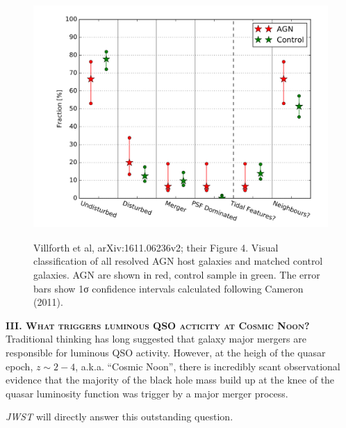\documentclass[11pt,epsf]{article}
\begin{document}
\begin{figure}[h]
  \begin{center}
   \hspace{-0.5cm}
    \includegraphics[height=8.5cm,width=12.2cm]
   {figs/Villforth_161106236v2_Fig4_right.png}
    \vspace{-10pt}
   \caption{Villforth et al, arXiv:1611.06236v2; their Figure 4. 
     Visual classification of all resolved AGN host galaxies and
     matched control galaxies. AGN are shown in red, control sample in
     green. The error bars show 1σ confidence intervals calculated
     following Cameron (2011).}
  \vspace{-14pt}
 \label{figtest-fig}
\end{center}
\end{figure}

\smallskip
\smallskip
\noindent
\textbf{\textsc{III. What triggers luminous QSO acticity at Cosmic Noon?}} 
Traditional thinking has long suggested that galaxy major mergers are responsible 
for luminous QSO activity. However, at the heigh of the quasar epoch, $z\sim2-4$, 
a.k.a. ``Cosmic Noon'', there is incredibly scant observational evidence that 
the majority of the black hole mass build up at the knee of the quasar luminosity 
function was trigger by a major merger process. 

\noindent
{\it JWST} will directly answer this outstanding question. 
\end{document}
